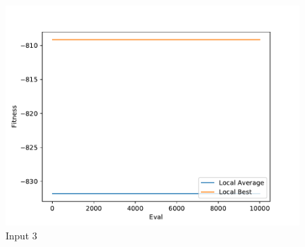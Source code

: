 \documentclass{standalone}
\begin{document}
\begin{figure}[!htb]
	\caption{Input 3}
	\label{fig:graph_3060}
	\includegraphics[width=\textwidth]{../graphs/graphs/3060.pdf}
\end{figure}
\end{document}
